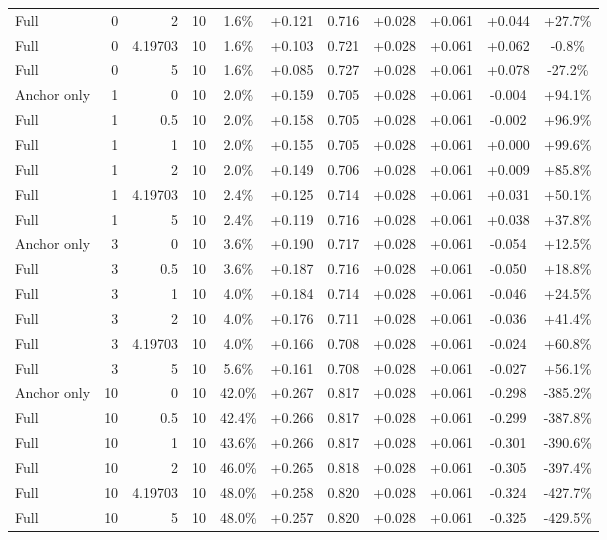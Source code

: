 \begin{table}[htbp]
\begin{tabular}{lrrrccccccc}
Full & 0 & 2 & 10 & 1.6\% & +0.121 & 0.716 & +0.028 & +0.061 & +0.044 & +27.7\% \\
Full & 0 & 4.19703 & 10 & 1.6\% & +0.103 & 0.721 & +0.028 & +0.061 & +0.062 & -0.8\% \\
Full & 0 & 5 & 10 & 1.6\% & +0.085 & 0.727 & +0.028 & +0.061 & +0.078 & -27.2\% \\
Anchor only & 1 & 0 & 10 & 2.0\% & +0.159 & 0.705 & +0.028 & +0.061 & -0.004 & +94.1\% \\
Full & 1 & 0.5 & 10 & 2.0\% & +0.158 & 0.705 & +0.028 & +0.061 & -0.002 & +96.9\% \\
Full & 1 & 1 & 10 & 2.0\% & +0.155 & 0.705 & +0.028 & +0.061 & +0.000 & +99.6\% \\
Full & 1 & 2 & 10 & 2.0\% & +0.149 & 0.706 & +0.028 & +0.061 & +0.009 & +85.8\% \\
Full & 1 & 4.19703 & 10 & 2.4\% & +0.125 & 0.714 & +0.028 & +0.061 & +0.031 & +50.1\% \\
Full & 1 & 5 & 10 & 2.4\% & +0.119 & 0.716 & +0.028 & +0.061 & +0.038 & +37.8\% \\
Anchor only & 3 & 0 & 10 & 3.6\% & +0.190 & 0.717 & +0.028 & +0.061 & -0.054 & +12.5\% \\
Full & 3 & 0.5 & 10 & 3.6\% & +0.187 & 0.716 & +0.028 & +0.061 & -0.050 & +18.8\% \\
Full & 3 & 1 & 10 & 4.0\% & +0.184 & 0.714 & +0.028 & +0.061 & -0.046 & +24.5\% \\
Full & 3 & 2 & 10 & 4.0\% & +0.176 & 0.711 & +0.028 & +0.061 & -0.036 & +41.4\% \\
Full & 3 & 4.19703 & 10 & 4.0\% & +0.166 & 0.708 & +0.028 & +0.061 & -0.024 & +60.8\% \\
Full & 3 & 5 & 10 & 5.6\% & +0.161 & 0.708 & +0.028 & +0.061 & -0.027 & +56.1\% \\
Anchor only & 10 & 0 & 10 & 42.0\% & +0.267 & 0.817 & +0.028 & +0.061 & -0.298 & -385.2\% \\
Full & 10 & 0.5 & 10 & 42.4\% & +0.266 & 0.817 & +0.028 & +0.061 & -0.299 & -387.8\% \\
Full & 10 & 1 & 10 & 43.6\% & +0.266 & 0.817 & +0.028 & +0.061 & -0.301 & -390.6\% \\
Full & 10 & 2 & 10 & 46.0\% & +0.265 & 0.818 & +0.028 & +0.061 & -0.305 & -397.4\% \\
Full & 10 & 4.19703 & 10 & 48.0\% & +0.258 & 0.820 & +0.028 & +0.061 & -0.324 & -427.7\% \\
Full & 10 & 5 & 10 & 48.0\% & +0.257 & 0.820 & +0.028 & +0.061 & -0.325 & -429.5\% \\

\end{tabular}
\end{table}
